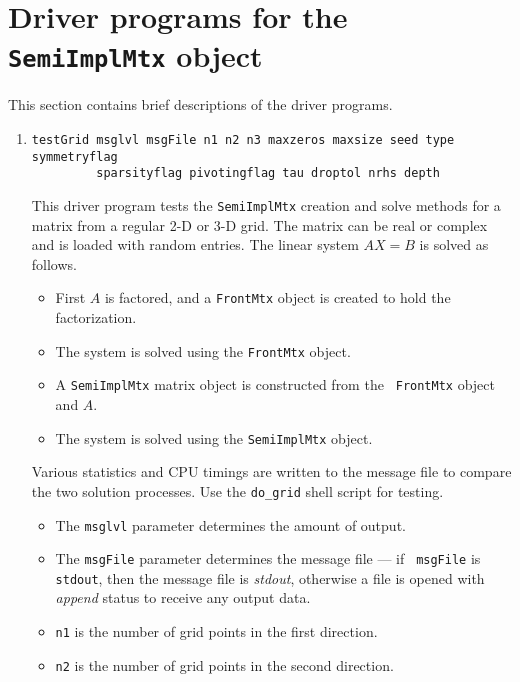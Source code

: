 \par
\section{Driver programs for the {\tt SemiImplMtx} object}
\label{section:SemiImplMtx:drivers}
\par
This section contains brief descriptions of the driver programs.
\par
\begin{enumerate}
\item
\begin{verbatim}
testGrid msglvl msgFile n1 n2 n3 maxzeros maxsize seed type symmetryflag
         sparsityflag pivotingflag tau droptol nrhs depth
\end{verbatim}
This driver program tests the {\tt SemiImplMtx} creation and solve
methods for a matrix from a regular 2-D or 3-D grid.
The matrix can be real or complex and is loaded with random
entries.
The linear system $AX = B$ is solved as follows.
\begin{itemize}
\item
First $A$ is factored, and a {\tt FrontMtx} object is created to
hold the factorization.
\item
The system is solved using the {\tt FrontMtx} object.
\item
A {\tt SemiImplMtx} matrix object is constructed from the {\tt
FrontMtx} object and $A$.
\item
The system is solved using the {\tt SemiImplMtx} object.
\end{itemize}
Various statistics and CPU timings are written to the message
file to compare the two solution processes.
Use the {\tt do\_grid} shell script for testing.
\par
\begin{itemize}
\item
The {\tt msglvl} parameter determines the amount of output.
\item
The {\tt msgFile} parameter determines the message file --- if {\tt
msgFile} is {\tt stdout}, then the message file is {\it stdout},
otherwise a file is opened with {\it append} status to receive any
output data.
\item
{\tt n1} is the number of grid points in the first direction.
\item
{\tt n2} is the number of grid points in the second direction.

\end{itemize}
\end{enumerate}
